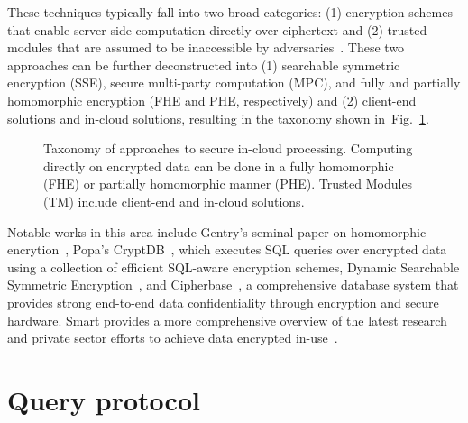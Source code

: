 \documentclass[notitlepage,longbibliography]{revtex4-1}
\newcommand{\figref}[1]{Fig.~\ref{#1}}
\begin{document}
These techniques typically fall into two broad categories: (1) encryption schemes that enable server-side computation directly over ciphertext and (2) trusted modules that are assumed to be inaccessible by adversaries~\cite{tutorial}. These two approaches can be further deconstructed into (1) searchable symmetric encryption (SSE), secure multi-party computation (MPC), and fully and partially homomorphic encryption (FHE and PHE, respectively) and (2) client-end solutions and in-cloud solutions, resulting in the taxonomy shown in~\figref{fig:taxonomy}.

\begin{figure}
	\begin{center}
	\end{center}
  \caption{Taxonomy of approaches to secure in-cloud processing.
           Computing directly on encrypted data can be done in a fully homomorphic (FHE) or partially homomorphic manner (PHE).
           Trusted Modules (TM) include client-end and in-cloud solutions.}
	\label{fig:taxonomy}
\end{figure}

Notable works in this area include Gentry's seminal paper on homomorphic encrytion~\cite{gentry}, Popa's CryptDB~\cite{cryptdb}, which executes SQL queries
over encrypted data using a collection of efficient SQL-aware encryption schemes, Dynamic Searchable Symmetric Encryption~\cite{dynamicsse}, and Cipherbase~\cite{cryptdb}, a comprehensive database system that provides strong end-to-end data confidentiality through encryption and secure hardware.
Smart provides a more comprehensive overview of the latest research and private sector efforts to achieve data encrypted in-use~\cite{smart}.


\section{Query protocol}
\end{document}
